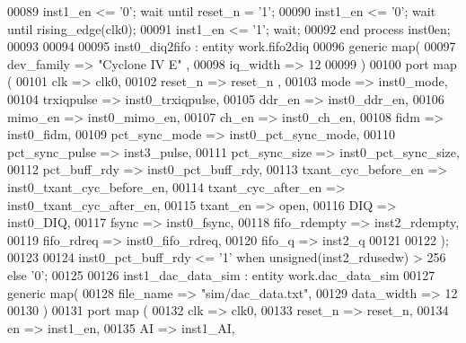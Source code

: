 \begin{DoxyCode}
00089       inst1\_en <= '0'; \textcolor{keywordflow}{wait} \textcolor{keywordflow}{until} reset\_n = '1';
00090       inst1\_en <= '0'; \textcolor{keywordflow}{wait} \textcolor{keywordflow}{until} rising\_edge(clk0);
00091       inst1\_en <= '1'; \textcolor{keywordflow}{wait};
00092    \textcolor{keywordflow}{end} \textcolor{keywordflow}{process} \textcolor{vhdlchar}{inst0en};
00093    
00094  
00095 inst0\_diq2fifo : \textcolor{keywordflow}{entity} work.fifo2diq
00096    \textcolor{keywordflow}{generic} \textcolor{keywordflow}{map}( 
00097       dev_family           => \textcolor{keyword}{"Cyclone IV E"}  ,
00098       iq_width             => \textcolor{vhdllogic}{12}
00099    \textcolor{vhdlchar}{)}
00100    \textcolor{keywordflow}{port} \textcolor{keywordflow}{map} (
00101       clk                  => clk0,
00102       reset_n              => reset_n ,
00103       mode                 => inst0_mode,
00104       trxiqpulse           => inst0_trxiqpulse,
00105       ddr_en               => inst0_ddr_en,
00106       mimo_en              => inst0_mimo_en,
00107       ch_en                => inst0_ch_en,
00108       fidm                 => inst0_fidm,
00109       pct_sync_mode        => inst0_pct_sync_mode, 
00110       pct_sync_pulse       => inst3_pulse,
00111       pct_sync_size        => inst0_pct_sync_size,
00112       pct_buff_rdy         => inst0_pct_buff_rdy,
00113       txant_cyc_before_en  => inst0_txant_cyc_before_en,
00114       txant_cyc_after_en   => inst0_txant_cyc_after_en,
00115       txant_en             => \textcolor{keywordflow}{open},
00116       DIQ                  => inst0_DIQ,
00117       fsync                => inst0_fsync,
00118       fifo_rdempty         => inst2_rdempty,
00119       fifo_rdreq           => inst0_fifo_rdreq,
00120       fifo_q               => inst2_q
00121      
00122         \textcolor{vhdlchar}{)};  
00123         
00124 inst0\_pct\_buff\_rdy <= '1' \textcolor{keywordflow}{when} \textcolor{comment}{unsigned}(inst2\_rdusedw) > \textcolor{vhdllogic}{256} \textcolor{keywordflow}{else} '0';
00125  
00126 inst1\_dac\_data\_sim : \textcolor{keywordflow}{entity} work.dac_data_sim 
00127    \textcolor{keywordflow}{generic} \textcolor{keywordflow}{map}( 
00128       file_name   => \textcolor{keyword}{"sim/dac\_data.txt"},
00129       data_width  => \textcolor{vhdllogic}{12} 
00130    \textcolor{vhdlchar}{)}
00131    \textcolor{keywordflow}{port} \textcolor{keywordflow}{map} (
00132       clk         => clk0,
00133       reset_n     => reset_n,
00134       en          => inst1_en,
00135       AI          => inst1_AI,

\end{DoxyCode}
